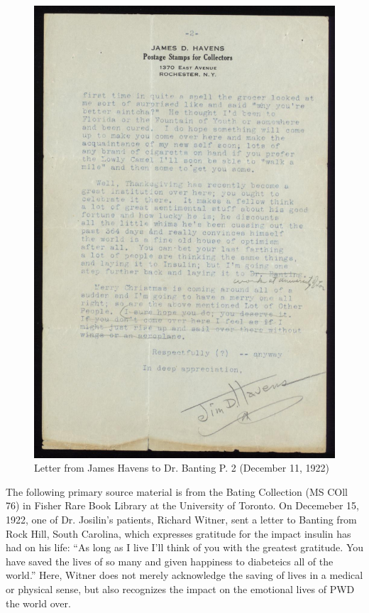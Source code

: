 \documentclass[12pt]{article}
\begin{document}
\begin{figure}[H]
\centering
  \includegraphics [width=5in]{thankshavep2}
  \caption{Letter from James Havens to Dr. Banting P. 2 (December 11, 1922)}
  \label{fig: Thanksgiving Letter P. 2}
\end{figure}

The following primary source material is from the Bating Collection (MS COll 76) in Fisher Rare Book Library at the University of Toronto. 
On Decemeber 15, 1922, one of Dr. Josilin's patients, Richard Witner, sent a letter to Banting from Rock Hill, South Carolina, which expresses gratitude for the impact insulin has had on his life:
``As long as I live I'll think of you with the greatest gratitude. You have saved the lives of so many and given happiness to diabeteics all of the world.''
Here, Witner does not merely acknowledge the saving of lives in a medical or physical sense, but also recognizes the impact on the emotional lives of PWD the world over. 
\end{document}
